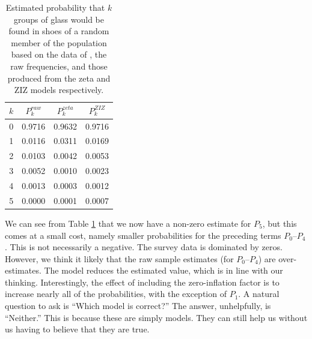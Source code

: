 \documentclass{article}\usepackage[]{graphicx}\usepackage[]{xcolor}
\begin{document}
\begin{table}[ht]
\centering
\begin{tabular}{cccc}
  \hline
$k$ & $P_k^{raw}$ & $P_k^{zeta}$ & $P_k^{ZIZ}$ \\ 
  \hline
0 & 0.9716 & 0.9632 & 0.9716 \\ 
  1 & 0.0116 & 0.0311 & 0.0169 \\ 
  2 & 0.0103 & 0.0042 & 0.0053 \\ 
  3 & 0.0052 & 0.0010 & 0.0023 \\ 
  4 & 0.0013 & 0.0003 & 0.0012 \\ 
  5 & 0.0000 & 0.0001 & 0.0007 \\ 
   \hline
\end{tabular}
\caption{Estimated probability that $k$ groups of glass would be found in shoes of a random member of the population based on the data of \citep{roux2001}, the raw frequencies, and those produced from the zeta and ZIZ models respectively.} 
\label{tab:ex1}
\end{table}

We can see from Table \ref{tab:ex1} that we now have a non-zero estimate for $P_5$,
but this comes at a small cost, namely smaller probabilities for the preceding terms $P_0$--$P_4$. This is not necessarily a negative. The survey data is dominated by zeros. However, we think it likely that the raw sample estimates (for $P_0$--$P_4$) are over-estimates. The model reduces the estimated value, which is in line with our thinking. Interestingly, the effect of including the zero-inflation factor is to increase nearly all of the probabilities, with the exception of $P_1$. A natural question to ask is ``Which model is correct?'' The answer, unhelpfully, is ``Neither.'' This is because these are simply models. They can still help us without us having to believe that they are true.
\end{document}

